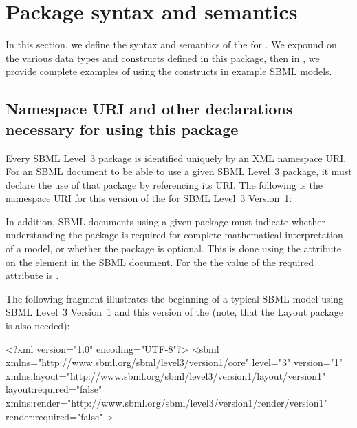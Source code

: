 \section{Package syntax and semantics}

In this section, we define the syntax and semantics of the
\RenderPackage for \sbmlthreecore. We expound on the various data types
and constructs defined in this package, then in , we
provide complete examples of using the constructs in example SBML
models.

\subsection{Namespace URI and other declarations necessary for using
this package}
\label{xml-namespace}

Every SBML Level~3 package is identified uniquely by an XML namespace
URI. For an SBML document to be able to use a given SBML Level~3
package, it must declare the use of that package by referencing its URI.
The following is the namespace URI for this version of the
\RenderPackage for SBML Level~3 Version~1:

\begin{center}
\end{center}

In addition, SBML documents using a given package must indicate whether
understanding the package is required for complete mathematical
interpretation of a model, or whether the package is optional. This is
done using the attribute  on the  element
in the SBML document. For the \RenderPackage the value of the required
attribute is .

The following fragment illustrates the beginning of a typical SBML model
using SBML Level~3 Version~1 and this version of the \RenderPackage (note, that the Layout package is also needed):

\begin{example}
<?xml version="1.0" encoding="UTF-8"?>
 <sbml xmlns="http://www.sbml.org/sbml/level3/version1/core" level="3" version="1"
   xmlns:layout="http://www.sbml.org/sbml/level3/version1/layout/version1" layout:required="false"
   xmlns:render="http://www.sbml.org/sbml/level3/version1/render/version1" render:required="false"
	>
	
\end{example}


